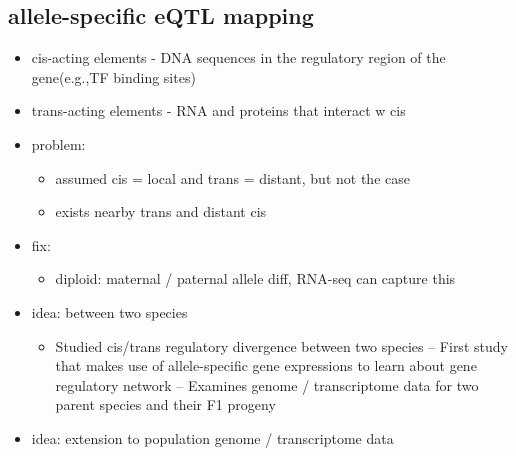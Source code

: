\documentclass[font=12pt]{article}
\begin{document}
\subsection{allele-specific eQTL mapping}
\begin{itemize}
	\item cis-acting elements - DNA sequences in the regulatory region of the gene(e.g.,TF binding	sites)
	\item trans-acting elements - RNA and proteins that interact w cis
	\item problem:
	\begin{itemize}
		\item assumed cis = local and trans = distant, but not the case
		\item exists nearby trans and distant cis
	\end{itemize}
	\item fix: 
	\begin{itemize}
		\item diploid: maternal / paternal allele diff, RNA-seq can capture this
	\end{itemize}
	\item idea: between two species
	\begin{itemize}
		\item Studied cis/trans regulatory divergence between two species
		– First study that makes use of allele-specific gene expressions to learn about gene regulatory network
		– Examines genome / transcriptome data for two parent species and their F1 progeny
	\end{itemize}
	\item idea: extension to population genome / transcriptome data
\end{itemize}
\end{document}
